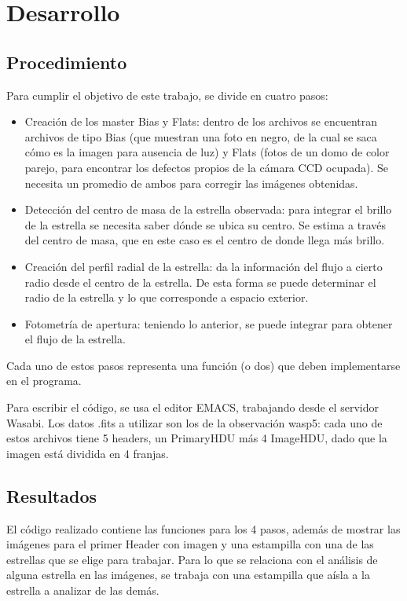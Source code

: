\documentclass[a4paper, 11pt, spanish]{article}
\begin{document}
\section{Desarrollo}
\subsection{Procedimiento}

Para cumplir el objetivo de este trabajo, se divide en cuatro pasos:

\begin{itemize}
	\item Creaci\'on de los master Bias y Flats: dentro de los archivos se encuentran archivos de tipo Bias (que muestran una foto en negro, de la cual se saca c\'omo es la imagen para ausencia de luz) y Flats (fotos de un domo de color parejo, para encontrar los defectos propios de la c\'amara CCD ocupada). Se necesita un promedio de ambos para corregir las im\'agenes obtenidas.
	\item Detecci\'on del centro de masa de la estrella observada: para integrar el brillo de la estrella se necesita saber d\'onde se ubica su centro. Se estima a trav\'es del centro de masa, que en este caso es el centro de donde llega m\'as brillo.
	\item Creaci\'on del perfil radial de la estrella: da la informaci\'on del flujo a cierto radio desde el centro de la estrella. De esta forma se puede determinar el radio de la estrella y lo que corresponde a espacio exterior.
	\item Fotometr\'ia de apertura: teniendo lo anterior, se puede integrar para obtener el flujo de la estrella. 
\end{itemize}

Cada uno de estos pasos representa una funci\'on (o dos) que deben implementarse en el programa. 

Para escribir el c\'odigo, se usa el editor EMACS, trabajando desde el servidor Wasabi. Los datos .fits a utilizar son los de la observaci\'on wasp5: cada uno de estos archivos tiene 5 headers, un PrimaryHDU m\'as 4 ImageHDU, dado que la imagen est\'a dividida en 4 franjas. 


\subsection{Resultados}

El c\'odigo realizado contiene las funciones para los 4 pasos, adem\'as de mostrar las im\'agenes para el primer Header con imagen y una estampilla con una de las estrellas que se elige para trabajar. Para lo que se relaciona con el an\'alisis de alguna estrella en las im\'agenes, se trabaja con una estampilla que a\'isla a la estrella a analizar de las dem\'as.
\end{document}
